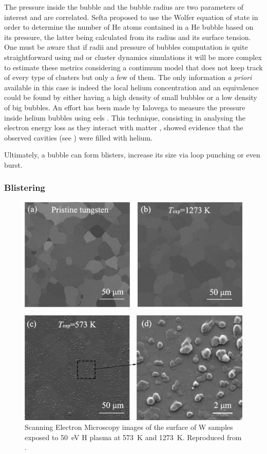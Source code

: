 The pressure inside the bubble and the bubble radius are two parameters of interest and are correlated.
Sefta  proposed to use the Wolfer equation of state in order to determine the number of \gls{He} atoms contained in a \gls{He} bubble based on its pressure, the latter being calculated from its radius and its surface tension.
One must be aware that if radii and pressure of bubbles computation is quite straightforward using \gls{md}  or cluster dynamics  simulations it will be more complex to estimate these metrics considering a continuum model that does not keep track of every type of clusters but only a few of them.
The only information \textit{a priori} available in this case is indeed the local helium concentration and an equivalence could be found by either having a high density of small bubbles or a low density of big bubbles.
An effort has been made by Ialovega to measure the pressure inside helium bubbles using \gls{eels} .
This technique, consisting in analysing the electron energy loss as they interact with matter , showed evidence that the observed cavities (see ) were filled with helium.

Ultimately, a bubble can form blisters, increase its size via \gls{loop punching} or even burst.

\subsubsection{Blistering}

\begin{figure}
    \centering
    \includegraphics[width=\linewidth]{Figures/Chapter1/h_blisters_in_tungsten.jpg}
    \caption{Scanning Electron Microscopy images of the surface of W samples exposed to \SI{50}{eV} H plasma at \SI{573}{K} and \SI{1273}{K}. Reproduced from \cite{chen_irradiation_2019}.}
\end{figure}


